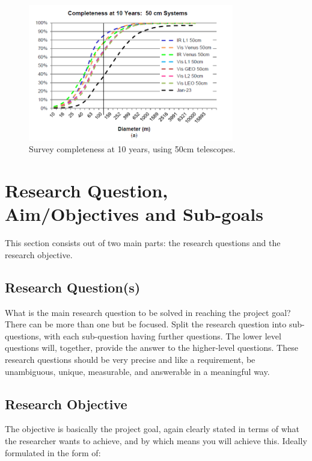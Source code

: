 \documentclass[12pt, english, NoHyper]{AE4010-template}
\begin{document}
\begin{figure}[thb]
 \centering
 \includegraphics[width=0.8\textwidth]{figures/surveycompleteness.png}
 \caption{Survey completeness at 10 years, using 50cm telescopes.}
 \label{fig:surveycompleteness}
\end{figure}


\section{Research Question, Aim/Objectives and Sub-goals}
This section consists out of two main parts: the research questions and the research objective.



\subsection{Research Question(s)}
What is the main research question to be solved in reaching the project goal? There can be more than one but be focused. Split the research question into sub-questions, with each sub-question having further questions. The lower level questions will, together, provide the answer to the higher-level questions. These research questions should be very precise and like a requirement, be unambiguous, unique, measurable, and answerable in a meaningful way. 



\subsection{Research Objective}
The objective is basically the project goal, again clearly stated in terms of what the researcher wants to achieve, and by which means you will achieve this. Ideally formulated in the form of: \newline
\end{document}
